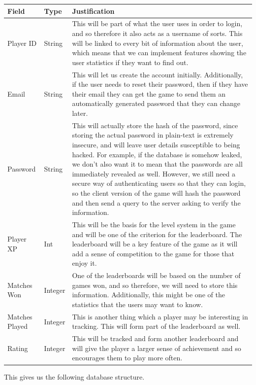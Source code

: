 \vs
\begin{longtable}{|p{3cm}|p{2cm}|p{9cm}|}
    \hline
    Field & Type & Justification\\
    \hline
    \hline
    Player ID & String & This will be part of what the user uses in order to login, and so therefore it also acts as a username of sorts. This will be linked to every bit of information about the user, which means that we can implement features showing the user statistics if they want to find out.\\
    \hline
    Email & String & This will let us create the account initially. Additionally, if the user needs to reset their password, then if they have their email they can get the game to send them an automatically generated password that they can change later.\\
    \hline
    Password & String & This will actually store the hash of the password, since storing the actual password in plain-text is extremely insecure, and will leave user details susceptible to being hacked. For example, if the database is somehow leaked, we don't also want it to mean that the passwords are all immediately revealed as well. However, we still need a secure way of authenticating users so that they can login, so the client version of the game will hash the password and then send a query to the server asking to verify the information.\\
    \hline
    Player XP & Int & This will be the basis for the level system in the game and will be one of the criterion for the leaderboard. The leaderboard will be a key feature of the game as it will add a sense of competition to the game for those that enjoy it.\\
    \hline
    Matches Won & Integer & One of the leaderboards will be based on the number of games won, and so therefore, we will need to store this information. Additionally, this might be one of the statistics that the users may want to know.\\
    \hline
    Matches Played & Integer & This is another thing which a player may be interesting in tracking. This will form part of the leaderboard as well.\\
    \hline
    Rating & Integer & This will be tracked and form another leaderboard and will give the player a larger sense of achievement and so encourages them to play more often.\\
    \hline
\end{longtable}

\vs
This gives us the following database structure.

